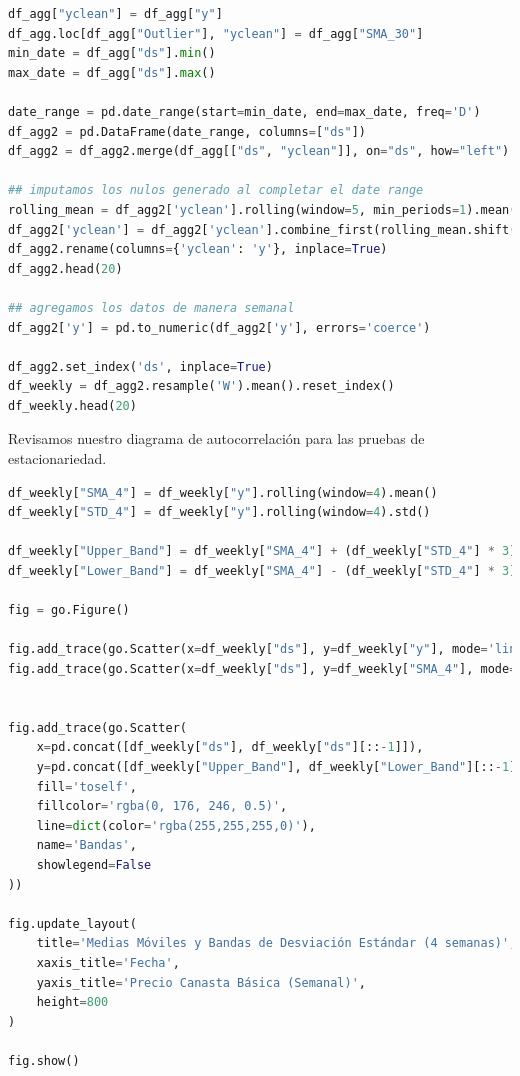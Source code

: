 \documentclass{article}
\begin{document}
\begin{lstlisting}[language=Python, caption={python version}]
df_agg["yclean"] = df_agg["y"]
df_agg.loc[df_agg["Outlier"], "yclean"] = df_agg["SMA_30"]
min_date = df_agg["ds"].min()
max_date = df_agg["ds"].max()

date_range = pd.date_range(start=min_date, end=max_date, freq='D')
df_agg2 = pd.DataFrame(date_range, columns=["ds"])
df_agg2 = df_agg2.merge(df_agg[["ds", "yclean"]], on="ds", how="left")

## imputamos los nulos generado al completar el date range
rolling_mean = df_agg2['yclean'].rolling(window=5, min_periods=1).mean()
df_agg2['yclean'] = df_agg2['yclean'].combine_first(rolling_mean.shift())
df_agg2.rename(columns={'yclean': 'y'}, inplace=True)
df_agg2.head(20)

## agregamos los datos de manera semanal
df_agg2['y'] = pd.to_numeric(df_agg2['y'], errors='coerce')

df_agg2.set_index('ds', inplace=True)
df_weekly = df_agg2.resample('W').mean().reset_index()
df_weekly.head(20)

\end{lstlisting}

Revisamos nuestro diagrama de autocorrelación para las pruebas de estacionariedad. 

\begin{lstlisting}[language=Python, caption={python version}]
df_weekly["SMA_4"] = df_weekly["y"].rolling(window=4).mean()
df_weekly["STD_4"] = df_weekly["y"].rolling(window=4).std()

df_weekly["Upper_Band"] = df_weekly["SMA_4"] + (df_weekly["STD_4"] * 3)
df_weekly["Lower_Band"] = df_weekly["SMA_4"] - (df_weekly["STD_4"] * 3)

fig = go.Figure()

fig.add_trace(go.Scatter(x=df_weekly["ds"], y=df_weekly["y"], mode='lines', name='Datos originales'))
fig.add_trace(go.Scatter(x=df_weekly["ds"], y=df_weekly["SMA_4"], mode='lines', name='SMA 4 semanas'))


fig.add_trace(go.Scatter(
    x=pd.concat([df_weekly["ds"], df_weekly["ds"][::-1]]), 
    y=pd.concat([df_weekly["Upper_Band"], df_weekly["Lower_Band"][::-1]]),
    fill='toself',
    fillcolor='rgba(0, 176, 246, 0.5)', 
    line=dict(color='rgba(255,255,255,0)'),
    name='Bandas',
    showlegend=False
))

fig.update_layout(
    title='Medias Móviles y Bandas de Desviación Estándar (4 semanas)',
    xaxis_title='Fecha',
    yaxis_title='Precio Canasta Básica (Semanal)',
    height=800 
)

fig.show()
\end{lstlisting}
\end{document}
